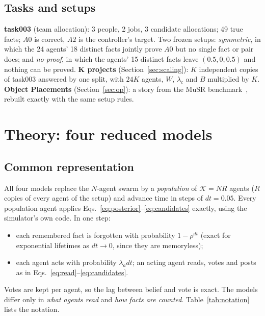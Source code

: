 \documentclass[10pt,a4paper]{article}
\begin{document}
\subsection{Tasks and setups}
\label{sec:tasks}
\textbf{task003} (team allocation): 3 people, 2 jobs, 3 candidate allocations; 49 true facts; $A0$ is correct, $A2$ is the
controller's target. Two frozen setups: \emph{symmetric}, in which the 24 agents' 18 distinct facts jointly prove $A0$ but
no single fact or pair does; and \emph{no-proof}, in which the agents' 15 distinct facts leave $(0.5,0,0.5)$ and nothing
can be proved. \textbf{K projects} (Section~\ref{sec:scaling}): $K$ independent copies of task003 answered by one split,
with $24K$ agents, $W$, $\lambda_c$ and $B$ multiplied by $K$. \textbf{Object Placements} (Section~\ref{sec:op}): a story
from the MuSR benchmark~\cite{sprague2024musr}, rebuilt exactly with the same setup rules.

\section{Theory: four reduced models}
\label{sec:theory}

\subsection{Common representation}
All four models replace the $N$-agent swarm by a \emph{population} of $\mathcal{K}=NR$ agents ($R$ copies of every agent
of the setup) and advance time in steps of $dt=0.05$. Every population agent applies Eqs.~\eqref{eq:posterior}--\eqref{eq:candidates}
exactly, using the simulator's own code. In one step:
\begin{itemize}
\item each remembered fact is forgotten with probability $1-\rho^{dt}$ (exact for exponential lifetimes as
  $dt\to0$, since they are memoryless);
\item each agent acts with probability $\lambda_a dt$; an acting agent reads, votes and posts as in
  Eqs.~\eqref{eq:read}--\eqref{eq:candidates}.
\end{itemize}
Votes are kept per agent, so the lag between belief and vote is exact. The models differ only in \emph{what agents read}
and \emph{how facts are counted}. Table~\ref{tab:notation} lists the notation.
\end{document}
